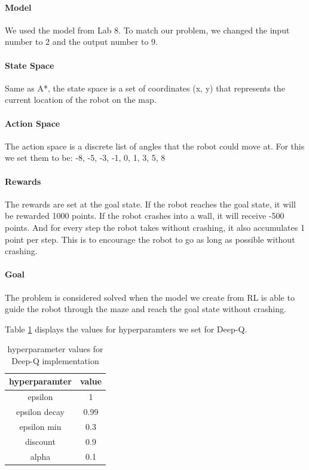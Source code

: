 \documentclass[11pt]{article}
\begin{document}
            \paragraph{Model} We used the model from Lab 8. To match our
            problem, we changed the input number to 2 and the output number to 9. 

            \paragraph{State Space}
            Same as A*, the state space is a set of coordinates (x, y) that represents the current location of the robot on the map. 

            \paragraph{Action Space}
            The action space is a discrete list of angles that the robot could move at. For this we set them to be: -8, -5, -3, -1, 0, 1, 3, 5, 8

            \paragraph{Rewards}
            The rewards are set at the goal state. If the robot reaches the goal
            state, it will be rewarded 1000 points. If the robot crashes into a
            wall, it will receive -500 points. And for every step the robot
            takes without crashing, it also accumulates 1 point per step. This
            is to encourage the robot to go as long as possible without
            crashing. 
            
            \paragraph{Goal}
            The problem is considered solved when the model we create from RL is able to guide the robot through the maze and reach the goal state without crashing.

        Table \ref{table:2} displays the values for hyperparamters we set for Deep-Q.

        \begin{table}[ht!]
            \centering
            \begin{tabular}{|c c|} 
            \hline
            hyperparamter & value  \\ [0.5ex] 
            \hline
            epsilon & 1 \\
            epsilon decay & 0.99 \\
            epsilon min & 0.3 \\
            discount & 0.9 \\ 
            alpha & 0.1 \\ [1ex] 
            \hline
            \end{tabular}
            \caption{hyperparameter values for Deep-Q implementation}
            \label{table:2}
        \end{table}
\end{document}
